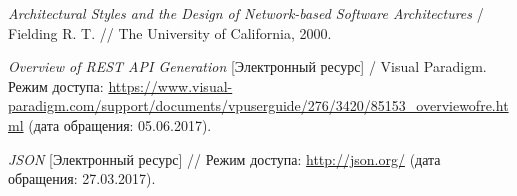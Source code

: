 \begin{thebibliography}{00}
	\emph{Architectural Styles and the Design of Network-based Software Architectures} / Fielding R. T. // The University of California, 2000.

	\emph{Overview of REST API Generation} [Электронный ресурс] / Visual Paradigm. Режим доступа: \url{https://www.visual-paradigm.com/support/documents/vpuserguide/276/3420/85153_overviewofre.html} (дата обращения: 05.06.2017).

	\emph{JSON} [Электронный ресурс] // Режим доступа: \url{http://json.org/} (дата
обращения: 27.03.2017).


\end{thebibliography}